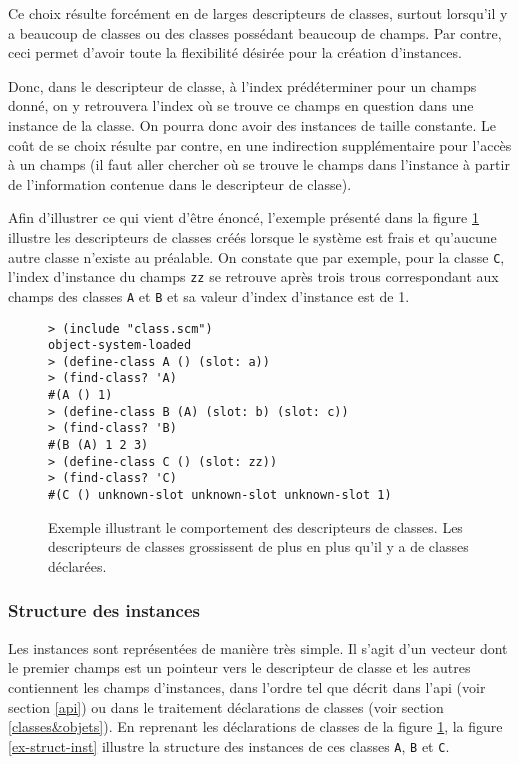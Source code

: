       Ce choix résulte forcément en de larges descripteurs de classes,
      surtout lorsqu'il y a beaucoup de classes ou des classes
      possédant beaucoup de champs. Par contre, ceci permet d'avoir
      toute la flexibilité désirée pour la création d'instances. 

      Donc, dans le descripteur de classe, à l'index prédéterminer pour
      un champs donné, on y retrouvera l'index où se trouve ce champs en
      question dans une instance de la classe. On pourra donc avoir des
      instances de taille constante. Le coût de se choix résulte par
      contre, en une indirection supplémentaire pour l'accès à un champs
      (il faut aller chercher où se trouve le champs dans l'instance à
      partir de l'information contenue dans le descripteur de classe).

      Afin d'illustrer ce qui vient d'être énoncé, l'exemple présenté
      dans la figure \ref{ex-cdesc} illustre les descripteurs de classes
      créés lorsque le système est \og frais \fg et qu'aucune autre
      classe n'existe au préalable. On constate que par exemple, pour la
      classe \texttt{C}, l'index d'instance du champs \texttt{zz} se
      retrouve après trois \og trous \fg correspondant aux champs des
      classes \texttt{A} et \texttt{B} et sa valeur d'index d'instance
      est de 1.

      \begin{figure}[h!]
        \begin{lstlisting}
> (include "class.scm")
object-system-loaded
> (define-class A () (slot: a))
> (find-class? 'A)
#(A () 1)
> (define-class B (A) (slot: b) (slot: c))
> (find-class? 'B)
#(B (A) 1 2 3)
> (define-class C () (slot: zz))
> (find-class? 'C)
#(C () unknown-slot unknown-slot unknown-slot 1)
        \end{lstlisting}
        \caption{Exemple illustrant le comportement des descripteurs de
          classes. Les descripteurs de classes grossissent de plus en
          plus qu'il y a de classes déclarées.}
        \label{ex-cdesc}
      \end{figure}

    \subsubsection{Structure des instances}
      \label{inst-struct}
      Les instances sont représentées de manière très simple. Il
      s'agit d'un vecteur dont le premier champs est un pointeur vers
      le descripteur de classe et les autres contiennent les champs
      d'instances, dans l'ordre tel que décrit dans l'api (voir
      section \ref{api}) ou dans le traitement déclarations de classes
      (voir section \ref{classes&objets}). En reprenant les
      déclarations de classes de la figure \ref{ex-cdesc}, la figure
      \ref{ex-struct-inst} illustre la structure des instances de ces
      classes \texttt{A}, \texttt{B} et \texttt{C}.

